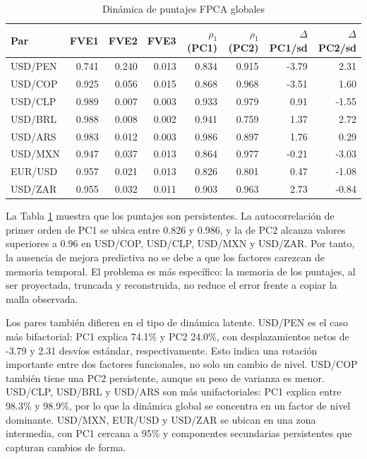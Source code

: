 \documentclass[a4paper,11pt]{article}
\begin{document}
\begin{table}[H]
\centering
\caption{Dinámica de puntajes FPCA globales}
\label{tab:fpca_scores}
\small
\begin{tabular}{lrrrrrrr}
\toprule
Par & FVE1 & FVE2 & FVE3 & \(\rho_1\)(PC1) & \(\rho_1\)(PC2) & \(\Delta\)PC1/sd & \(\Delta\)PC2/sd \\
\midrule
USD/PEN & 0.741 & 0.240 & 0.013 & 0.834 & 0.915 & -3.79 & 2.31 \\
USD/COP & 0.925 & 0.056 & 0.015 & 0.868 & 0.968 & -3.51 & 1.60 \\
USD/CLP & 0.989 & 0.007 & 0.003 & 0.933 & 0.979 & 0.91 & -1.55 \\
USD/BRL & 0.988 & 0.008 & 0.002 & 0.941 & 0.759 & 1.37 & 2.72 \\
USD/ARS & 0.983 & 0.012 & 0.003 & 0.986 & 0.897 & 1.76 & 0.29 \\
USD/MXN & 0.947 & 0.037 & 0.013 & 0.864 & 0.977 & -0.21 & -3.03 \\
EUR/USD & 0.957 & 0.021 & 0.013 & 0.826 & 0.801 & 0.47 & -1.08 \\
USD/ZAR & 0.955 & 0.032 & 0.011 & 0.903 & 0.963 & 2.73 & -0.84 \\
\bottomrule
\end{tabular}
\end{table}

La Tabla \ref{tab:fpca_scores} muestra que los puntajes son persistentes. La autocorrelación de primer orden de PC1 se ubica entre 0.826 y 0.986, y la de PC2 alcanza valores superiores a 0.96 en USD/COP, USD/CLP, USD/MXN y USD/ZAR. Por tanto, la ausencia de mejora predictiva no se debe a que los factores carezcan de memoria temporal. El problema es más específico: la memoria de los puntajes, al ser proyectada, truncada y reconstruida, no reduce el error frente a copiar la malla observada.

Los pares también difieren en el tipo de dinámica latente. USD/PEN es el caso más bifactorial: PC1 explica 74.1\% y PC2 24.0\%, con desplazamientos netos de -3.79 y 2.31 desvíos estándar, respectivamente. Esto indica una rotación importante entre dos factores funcionales, no solo un cambio de nivel. USD/COP también tiene una PC2 persistente, aunque su peso de varianza es menor. USD/CLP, USD/BRL y USD/ARS son más unifactoriales: PC1 explica entre 98.3\% y 98.9\%, por lo que la dinámica global se concentra en un factor de nivel dominante. USD/MXN, EUR/USD y USD/ZAR se ubican en una zona intermedia, con PC1 cercana a 95\% y componentes secundarias persistentes que capturan cambios de forma.
\end{document}
